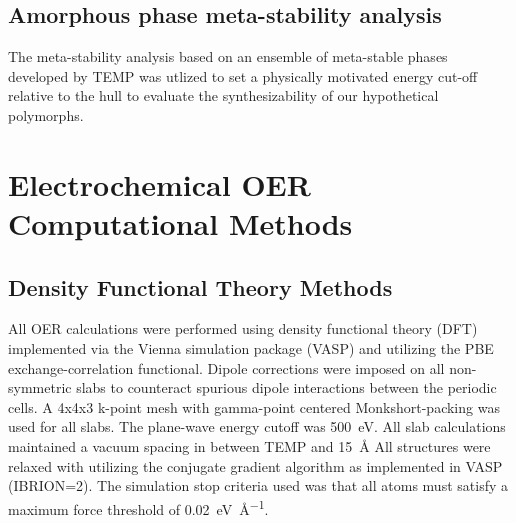 

\subsection{Amorphous phase meta-stability analysis} %
%

%
The meta-stability analysis based on an ensemble of meta-stable phases developed by TEMP was utlized to set a physically motivated energy cut-off relative to the hull to evaluate the synthesizability of our hypothetical polymorphs.




\section{Electrochemical OER Computational Methods}  %
%

\subsection{Density Functional Theory Methods}  %
%
%
All OER calculations were performed using density functional theory (DFT) implemented via the Vienna  simulation package (VASP)
\cite{Kresse1995,Kresse1996_0,Kresse1996_1}
and utilizing the PBE exchange-correlation functional\cite{Perdew1996}.
%
Dipole corrections were imposed on all non-symmetric slabs to counteract spurious dipole interactions between the periodic cells.\cite{Neugebauer1992}
%
A 4x4x3 k-point mesh with gamma-point centered Monkshort-packing\cite{Monkhorst1976} was used for all slabs.
%
The plane-wave energy cutoff was \SI{500}{\electronvolt}.
%
All slab calculations maintained a vacuum spacing in between TEMP and \SI{15}{\angstrom}
%
All structures were relaxed with utilizing the conjugate gradient algorithm as implemented in VASP (IBRION\num{=2}).
%
The simulation stop criteria used was that all atoms must satisfy a maximum force threshold of \SI{0.02}{\electronvolt\per\angstrom}.


